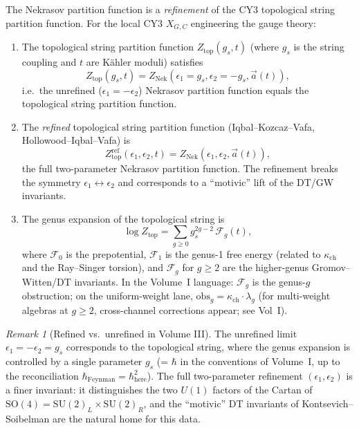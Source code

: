 \documentclass[11pt]{article}
\theoremstyle{definition}
\theoremstyle{remark}
\newtheorem{remark}[theorem]{Remark}
\newcommand{\cF}{\mathcal{F}}
\newcommand{\Nek}{\mathrm{Nek}}
\newcommand{\SU}{\mathrm{SU}}
\begin{document}
The Nekrasov partition function is a \emph{refinement} of the CY3 topological string partition
function. For the local CY3 $X_{G,C}$ engineering the gauge theory:
\begin{enumerate}[label=(\roman*)]
 \item The topological string partition function $Z_{\mathrm{top}}(g_s, t)$ (where $g_s$ is the
 string coupling and $t$ are K\"ahler moduli) satisfies
 \begin{equation}
 \label{eq:ztop-nekrasov}
 Z_{\mathrm{top}}(g_s, t) = Z_{\Nek}(\epsilon_1 = g_s, \epsilon_2 = -g_s, \vec{a}(t)),
 \end{equation}
 i.e.\ the unrefined ($\epsilon_1 = -\epsilon_2$) Nekrasov partition function equals the
 topological string partition function.
 \item The \emph{refined} topological string partition function (Iqbal--Kozcaz--Vafa,
 Hollowood--Iqbal--Vafa) is
 \begin{equation}
 \label{eq:ztop-refined}
 Z_{\mathrm{top}}^{\mathrm{ref}}(\epsilon_1, \epsilon_2, t) = Z_{\Nek}(\epsilon_1, \epsilon_2, \vec{a}(t)),
 \end{equation}
 the full two-parameter Nekrasov partition function. The refinement breaks the symmetry
 $\epsilon_1 \leftrightarrow \epsilon_2$ and corresponds to a ``motivic'' lift of the DT/GW
 invariants.
 \item The genus expansion of the topological string is
 \begin{equation}
 \label{eq:genus-expansion}
 \log Z_{\mathrm{top}} = \sum_{g \geq 0} g_s^{2g-2} \, \cF_g(t),
 \end{equation}
 where $\cF_0$ is the prepotential, $\cF_1$ is the genus-1 free energy (related to $\kappa_{\mathrm{ch}}$ and
 the Ray--Singer torsion), and $\cF_g$ for $g \geq 2$ are the higher-genus Gromov--Witten/DT
 invariants. In the Volume~I language: $\cF_g$ is the genus-$g$ obstruction;
 on the uniform-weight lane, $\mathrm{obs}_g = \kappa_{\mathrm{ch}} \cdot \lambda_g$
 (for multi-weight algebras at $g \geq 2$, cross-channel corrections
 appear; see Vol~I).
\end{enumerate}

\begin{remark}[Refined vs.\ unrefined in Volume III]
 \label{rem:refined-unrefined}
 The unrefined limit $\epsilon_1 = -\epsilon_2 = g_s$ corresponds to the topological string,
 where the genus expansion is controlled by a single parameter $g_s$ (= $\hbar$ in the
 conventions of Volume~I, up to the reconciliation $\hbar_{\text{Feynman}} = \hbar_{\text{here}}^2$).
 The full two-parameter refinement $(\epsilon_1, \epsilon_2)$ is a finer invariant: it
 distinguishes the two $U(1)$ factors of the Cartan of $\mathrm{SO}(4) = \SU(2)_L \times \SU(2)_R$,
 and the ``motivic'' DT invariants of Kontsevich--Soibelman are the natural home for this data.
\end{remark}
\end{document}

